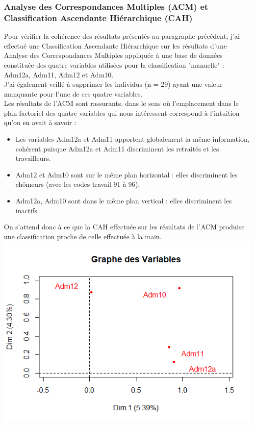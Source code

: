 \documentclass{book}
\begin{document}
\subsubsection{Analyse des Correspondances Multiples (ACM) et Classification Ascendante Hiérarchique (CAH)}
\noindent
Pour vérifier la cohérence des résultats présentés au paragraphe précédent, j'ai effectué une Classification Ascendante Hiérarchique sur les résultats d'une Analyse des Correspondances Multiples appliquée
à une base de données constituée des quatre variables utilisées pour la classification "manuelle" : Adm12a, Adm11, Adm12 et Adm10. \\
J'ai également veillé à supprimer les individus (n = 29) ayant une valeur manquante pour l'une de ces quatre variables. \\

\noindent
Les résultats de l'ACM sont rassurants, dans le sens où l'emplacement dans le plan factoriel des quatre variables qui nous intéressent correspond à l'intuition qu'on en avait à savoir : 
\begin{itemize}
\item Les variables Adm12a et Adm11 apportent globalement la même information, cohérent puisque Adm12a et Adm11 discriminent les retraités et les travailleurs.
\item Adm12 et Adm10 sont sur le même plan horizontal : elles discriminent les chômeurs (avec les codes travail 91 à 96).
\item Adm12a, Adm10 sont dans le même plan vertical : elles discriminent les inactifs.
\end{itemize}
On s'attend donc à ce que la CAH effectuée sur les résultats de l'ACM produise une classification proche de celle effectuée à la main.\\
\includegraphics[scale = 1]{ACM_var.png}
\end{document}
